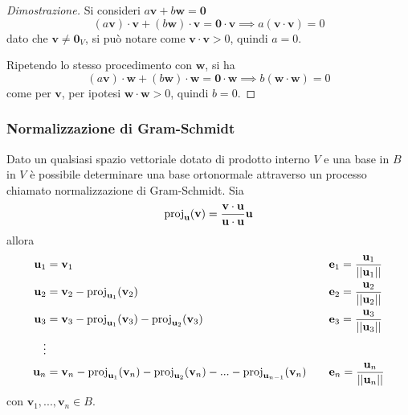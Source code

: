 \documentclass{article}
\begin{document}
    \begin{proof}[Dimostrazione]
        Si consideri $a \mathbf{v} + b \mathbf{w} = \mathbf{0}$ 
        \[
            (a \mathbf{v}) \cdot \mathbf{v} + (b \mathbf{w}) \cdot \mathbf{v} = \mathbf{0} \cdot \mathbf{v} \implies a (\mathbf{v} \cdot \mathbf{v}) = 0
        \]
        dato che $\mathbf{v} \neq \mathbf{0}_V$, si può notare come $\mathbf{v} \cdot \mathbf{v} > 0$, quindi $a = 0$.

        \vspace{5pt}
        Ripetendo lo stesso procedimento con $\mathbf{w}$, si ha
        \[
            (a \mathbf{v}) \cdot \mathbf{w} + (b \mathbf{w}) \cdot \mathbf{w} = \mathbf{0} \cdot \mathbf{w} \implies b (\mathbf{w} \cdot \mathbf{w}) = 0
        \]
        come per $\mathbf{v}$, per ipotesi $\mathbf{w} \cdot \mathbf{w} > 0$, quindi $b = 0$.

    \end{proof}

    \vspace{10pt}
    \subsubsection{Normalizzazione di Gram-Schmidt}
    Dato un qualsiasi spazio vettoriale dotato di prodotto interno $V$ e una base in $B$ in $V$ è possibile determinare una base ortonormale 
    attraverso un processo chiamato normalizzazione di Gram-Schmidt. Sia 
    \[
        \textnormal{proj}_{\mathbf{u}}(\mathbf{v}) = \frac{\mathbf{v} \cdot \mathbf{u}}{\mathbf{u} \cdot \mathbf{u}} \mathbf{u}
    \]
    allora
    \[
        \begin{aligned}
            \mathbf{u}_{1} &= \mathbf{v}_{1} &\quad& \mathbf{e}_{1} = \frac{\mathbf{u}_{1}}{||\mathbf{u}_{1}||} \\
            \mathbf{u}_{2} &= \mathbf{v}_{2} - \textnormal{proj}_{\mathbf{u}_{1}}(\mathbf{v}_{2}) &\quad& \mathbf{e}_{2} = \frac{\mathbf{u}_{2}}{||\mathbf{u}_{2}||} \\
            \mathbf{u}_{3} &= \mathbf{v}_{3} - \textnormal{proj}_{\mathbf{u}_{1}}(\mathbf{v}_3) - \textnormal{proj}_{\mathbf{u}_{2}}(\mathbf{v}_3) &\quad& \mathbf{e}_{3} = \frac{\mathbf{u}_{3}}{||\mathbf{u}_{3}||} \\
            \vdots \\
            \mathbf{u}_{n} &= \mathbf{v}_{n} - \textnormal{proj}_{\mathbf{u}_{1}}(\mathbf{v}_{n}) - \textnormal{proj}_{\mathbf{u}_{2}}(\mathbf{v}_{n}) - ... - \textnormal{proj}_{\mathbf{u}_{n - 1}}(\mathbf{v}_{n}) &\quad& \mathbf{e}_{n} = \frac{\mathbf{u}_{n}}{||\mathbf{u}_{n}||} \\
        \end{aligned}
    \]
    con $\mathbf{v}_{1}, ..., \mathbf{v}_{n} \in B$.
\end{document}
